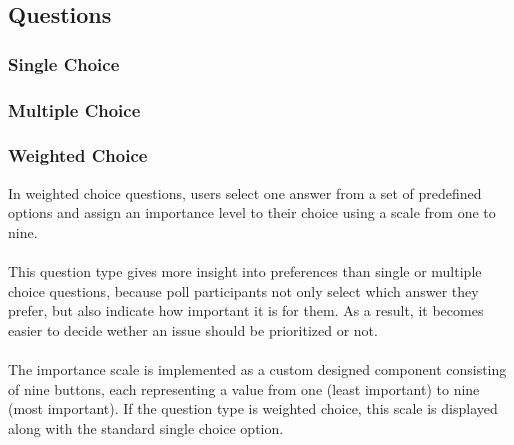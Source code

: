 \documentclass[a4paper,12pt]{report}
\begin{document}
\subsection{Questions}
\subsubsection{Single Choice}
\subsubsection{Multiple Choice}
\subsubsection{Weighted Choice}
In weighted choice questions, users select one answer from a set of predefined options and assign an importance level to their choice using a scale from one to nine.\\\\
This question type gives more insight into preferences than single or multiple choice questions, because poll participants not only select which answer they prefer, but also indicate how important it is for them. As a result, it becomes easier to decide wether an issue should be prioritized or not.\\\\
The importance scale is implemented as a custom designed component consisting of nine buttons, each representing a value from one (least important) to nine (most important). If the question type is weighted choice, this scale is displayed along with the standard single choice option.\\\\
\end{document}

